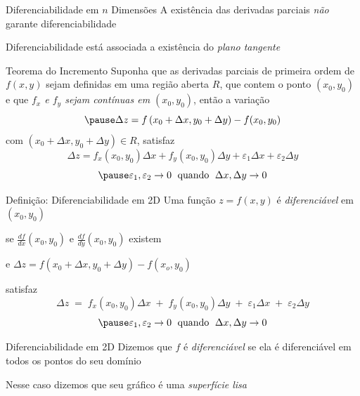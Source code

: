 \begin{frame}{Diferenciabilidade em $n$ Dimensões}
	A existência das derivadas parciais \emph{não} garante diferenciabilidade

	\pause
	\vspace{\baselineskip}
	Diferenciabilidade está associada a existência do \emph{plano tangente}
\end{frame}

\begin{frame}{Teorema do Incremento}
	Suponha que as derivadas parciais de primeira ordem de $f(x, y)$ sejam
	definidas em uma região aberta $R$, que contem o ponto $(x_0, y_0)$
  \pause
	e que \emph{$f_x$ e $f_y$ sejam contínuas em $(x_0, y_0)$},
	\pause
	então a variação
	\[
		\pause
    \Delta z
		= f\left(x_0+\Delta x, y_0 + \Delta y\right)
		- f(x_0, y_0)
	\]
	\pause
  com \(\left(x_0+\Delta x, y_0 + \Delta y\right)\in R\),
	\pause
  satisfaz
	\[
		\Delta z
		= f_x(x_0, y_0) \Delta x
		+ f_y(x_0, y_0) \Delta y
		+ \varepsilon_1 \Delta x
		+ \varepsilon_2 \Delta y
	\]
	\[
		\pause
    \varepsilon_1, \varepsilon_2 \to 0
    \;\text{ quando }\;
    \Delta x, \Delta y \to 0
	\]
\end{frame}

\begin{frame}{Definição: Diferenciabilidade em 2D}
	Uma função \(z=f(x, y)\) é \emph{diferenciável} em \((x_0, y_0)\)

  \pause
  \vspace{0.5\baselineskip}
  se \(\frac{df}{dx}(x_0, y_0)\) e \(\frac{df}{dy}(x_0, y_0)\) existem

  \pause
  \vspace{0.5\baselineskip}
  e \(\Delta z = f(x_0+\Delta x, y_0+\Delta y)-f(x_o, y_0)\)

  \pause
  \vspace{0.5\baselineskip}
  satisfaz
	\[
		\Delta z
		\;=\; f_x(x_0, y_0) \Delta x
		\;+\; f_y(x_0, y_0) \Delta y
		\;+\; \varepsilon_1 \Delta x
		\;+\; \varepsilon_2 \Delta y
	\]
	\[
		\pause
    \varepsilon_1, \varepsilon_2 \to 0
    \;\text{ quando }\;
    \Delta x, \Delta y \to 0
	\]
\end{frame}

\begin{frame}{Diferenciabilidade em 2D}
	Dizemos que $f$ é \emph{diferenciável}
	se ela é diferenciável em todos os
	pontos do seu domínio

	\pause
    \vspace{0.5\baselineskip}
    Nesse caso dizemos que seu gráfico é uma \emph{superfície lisa}
\end{frame}

